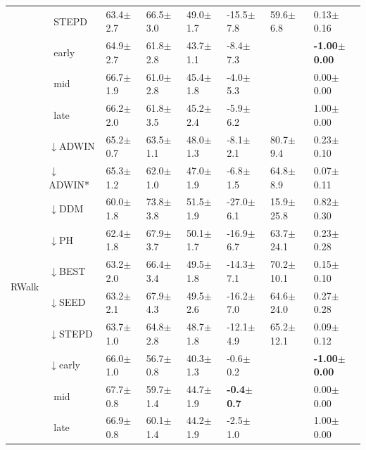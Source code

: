\begin{tabular}{llllllll}
 & $\ \;$STEPD & 63.4\tiny{$\pm$2.7} & 66.5\tiny{$\pm$3.0} & 49.0\tiny{$\pm$1.7} & -15.5\tiny{$\pm$7.8} & 59.6\tiny{$\pm$6.8} & 0.13\tiny{$\pm$0.16} \\
 & $\ \;$early & 64.9\tiny{$\pm$2.7} & 61.8\tiny{$\pm$2.8} & 43.7\tiny{$\pm$1.1} & -8.4\tiny{$\pm$7.3} &  & \textbf{-1.00\tiny{$\pm$0.00}} \\
 & $\ \;$mid & 66.7\tiny{$\pm$1.9} & 61.0\tiny{$\pm$2.8} & 45.4\tiny{$\pm$1.8} & -4.0\tiny{$\pm$5.3} &  & 0.00\tiny{$\pm$0.00} \\
 & $\ \;$late & 66.2\tiny{$\pm$2.0} & 61.8\tiny{$\pm$3.5} & 45.2\tiny{$\pm$2.4} & -5.9\tiny{$\pm$6.2} &  & 1.00\tiny{$\pm$0.00} \\
\midrule
\multirow[t]{10}{*}{RWalk} & $\downarrow$ADWIN & 65.2\tiny{$\pm$0.7} & 63.5\tiny{$\pm$1.1} & 48.0\tiny{$\pm$1.3} & -8.1\tiny{$\pm$2.1} & 80.7\tiny{$\pm$9.4} & 0.23\tiny{$\pm$0.10} \\
 & $\downarrow$ADWIN* & 65.3\tiny{$\pm$1.2} & 62.0\tiny{$\pm$1.0} & 47.0\tiny{$\pm$1.9} & -6.8\tiny{$\pm$1.5} & 64.8\tiny{$\pm$8.9} & 0.07\tiny{$\pm$0.11} \\
 & $\downarrow$DDM & 60.0\tiny{$\pm$1.8} & 73.8\tiny{$\pm$3.8} & 51.5\tiny{$\pm$1.9} & -27.0\tiny{$\pm$6.1} & 15.9\tiny{$\pm$25.8} & 0.82\tiny{$\pm$0.30} \\
 & $\downarrow$PH & 62.4\tiny{$\pm$1.8} & 67.9\tiny{$\pm$3.7} & 50.1\tiny{$\pm$1.7} & -16.9\tiny{$\pm$6.7} & 63.7\tiny{$\pm$24.1} & 0.23\tiny{$\pm$0.28} \\
 & $\downarrow$BEST & 63.2\tiny{$\pm$2.0} & 66.4\tiny{$\pm$3.4} & 49.5\tiny{$\pm$1.8} & -14.3\tiny{$\pm$7.1} & 70.2\tiny{$\pm$10.1} & 0.15\tiny{$\pm$0.10} \\
 & $\downarrow$SEED & 63.2\tiny{$\pm$2.1} & 67.9\tiny{$\pm$4.3} & 49.5\tiny{$\pm$2.6} & -16.2\tiny{$\pm$7.0} & 64.6\tiny{$\pm$24.0} & 0.27\tiny{$\pm$0.28} \\
 & $\downarrow$STEPD & 63.7\tiny{$\pm$1.0} & 64.8\tiny{$\pm$2.8} & 48.7\tiny{$\pm$1.8} & -12.1\tiny{$\pm$4.9} & 65.2\tiny{$\pm$12.1} & 0.09\tiny{$\pm$0.12} \\
 & $\downarrow$early & 66.0\tiny{$\pm$1.0} & 56.7\tiny{$\pm$0.8} & 40.3\tiny{$\pm$1.3} & -0.6\tiny{$\pm$0.2} &  & \textbf{-1.00\tiny{$\pm$0.00}} \\
 & $\ \;$mid & 67.7\tiny{$\pm$0.8} & 59.7\tiny{$\pm$1.4} & 44.7\tiny{$\pm$1.9} & \textbf{-0.4\tiny{$\pm$0.7}} &  & 0.00\tiny{$\pm$0.00} \\
 & $\ \;$late & 66.9\tiny{$\pm$0.8} & 60.1\tiny{$\pm$1.4} & 44.2\tiny{$\pm$1.9} & -2.5\tiny{$\pm$1.0} &  & 1.00\tiny{$\pm$0.00} \\

\end{tabular}
